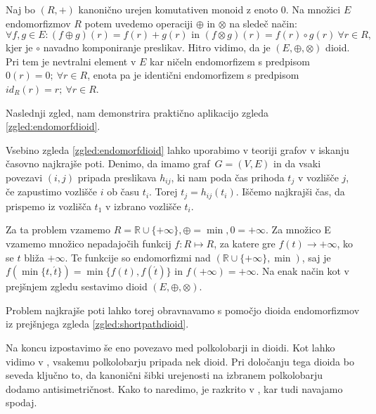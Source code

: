\documentclass[mat1]{fmfdelo}
\newcommand{\R}{\mathbb{R}}
\begin{document}
\begin{zgled} \label{zgled:endomorfdioid}
	Naj bo $(R, +)$ kanonično urejen komutativen monoid z enoto $0$. Na množici $E$ endomorfizmov $R$ potem uvedemo operaciji $\oplus$ in $\otimes$ na sledeč način: $$\forall f, g \in E: (f\oplus g)(r) = f(r) + g(r) \text{~in~} (f\otimes g)(r) = f(r) \circ g(r) ~\forall r\in R,$$ kjer je $\circ$ navadno komponiranje preslikav. Hitro vidimo, da je $(E, \oplus, \otimes)$ dioid.
	Pri tem je nevtralni element v $E$ kar ničeln endomorfizem s predpisom $0(r) = 0;~\forall r\in R$, enota pa je identični endomorfizem s predpisom $id_R(r) = r;~\forall r\in R$.
\end{zgled}

Naslednji zgled, nam demonstrira praktično aplikacijo zgleda \ref{zgled:endomorfdioid}.

\begin{zgled}\label{zgled:shortpathdioid}
	Vsebino zgleda \ref{zgled:endomorfdioid} lahko uporabimo v teoriji grafov v iskanju časovno najkrajše poti. Denimo, da imamo graf~$G = (V, E)$ in da vsaki povezavi $(i, j)$ pripada preslikava $h_{ij}$, ki nam poda čas prihoda $t_j$ v vozlišče $j$, če zapustimo vozlišče $i$ ob času $t_i$. Torej $ t_j = h_{ij}(t_i)$. Iščemo najkrajši čas, da prispemo iz vozlišča $t_1$ v izbrano vozlišče $t_i$.
	
	Za ta problem vzamemo $R = \R\cup\{+\infty\}, \oplus = \min, 0 = +\infty$. Za množico E vzamemo množico nepadajočih funkcij $f: R \mapsto R$, za katere gre $f(t) \to +\infty$, ko se $t$ bliža $+\infty$. Te funkcije so endomorfizmi nad $(\R\cup\{+\infty\}, \min)$, saj je $f(\min\{t, \acute{t}\}) = \min\{f(t),f(\acute{t})\}$ in $f(+\infty) = +\infty$. Na enak način kot v prejšnjem zgledu sestavimo dioid $(E, \oplus, \otimes)$.
\end{zgled}

Problem najkrajše poti lahko torej obravnavamo s pomočjo dioida endomorfizmov iz prejšnjega zgleda \ref{zgled:shortpathdioid}.

Na koncu izpostavimo še eno povezavo med polkolobarji in dioidi. Kot lahko vidimo v \cite[poglavje 6.\,9.\,]{bib:Gondran}, vsakemu polkolobarju pripada nek dioid. Pri določanju tega dioida bo seveda ključno to, da kanonični šibki urejenosti na izbranem polkolobarju dodamo antisimetričnost. Kako to naredimo, je razkrito v \cite[trditev 6.\,9.\,1.\,]{bib:Gondran}, kar tudi navajamo spodaj.
\end{document}
